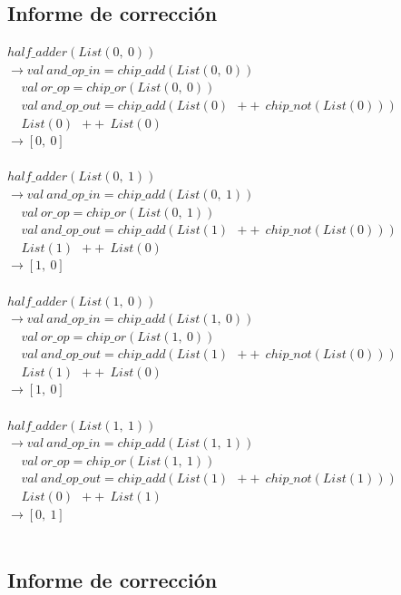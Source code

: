 \documentclass[12pt, a4paper]{article}
\begin{document}
\subsection{Informe de corrección}

$half\_adder(List(0,~0))$\\
$\rightarrow val~and\_op\_in = chip\_add(List(0,~0))$\\
$~~~~~val~or\_op = chip\_or(List(0,~0))$\\
$~~~~~val~and\_op\_out = chip\_add(List(0)~~++~~chip\_not(List(0)))$\\
$~~~~~List(0)~~++~~List(0)$\\
$\rightarrow [0,~0]$\\ \\
$half\_adder(List(0,~1))$\\
$\rightarrow val~and\_op\_in = chip\_add(List(0,~1))$\\
$~~~~~val~or\_op = chip\_or(List(0,~1))$\\
$~~~~~val~and\_op\_out = chip\_add(List(1)~~++~~chip\_not(List(0)))$\\
$~~~~~List(1)~~++~~List(0)$\\
$\rightarrow [1,~0]$\\ \\
$half\_adder(List(1,~0))$\\
$\rightarrow val~and\_op\_in = chip\_add(List(1,~0))$\\
$~~~~~val~or\_op = chip\_or(List(1,~0))$\\
$~~~~~val~and\_op\_out = chip\_add(List(1)~~++~~chip\_not(List(0)))$\\
$~~~~~List(1)~~++~~List(0)$\\
$\rightarrow [1,~0]$\\ \\
$half\_adder(List(1,~1))$\\
$\rightarrow val~and\_op\_in = chip\_add(List(1,~1))$\\
$~~~~~val~or\_op = chip\_or(List(1,~1))$\\
$~~~~~val~and\_op\_out = chip\_add(List(1)~~++~~chip\_not(List(1)))$\\
$~~~~~List(0)~~++~~List(1)$\\
$\rightarrow [0,~1]$\\ \\

\subsection{Informe de corrección}
\end{document}

